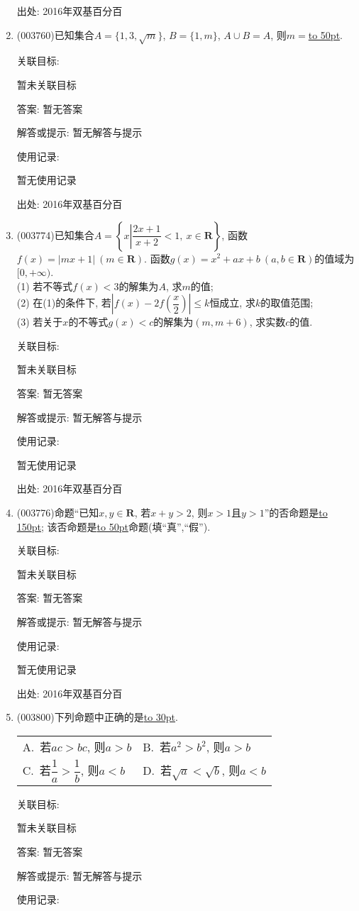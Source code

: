 \documentclass[10pt,a4paper]{article}
\newcommand{\blank}[1]{\underline{\hbox to #1pt{}}}
\newcommand{\twoch}[4]{\par\begin{tabular}{p{.46\textwidth}p{.46\textwidth}}
A.~#1& B.~#2\\
C.~#3& D.~#4
\end{tabular}}
\begin{document}
\begin{enumerate}[1.]
出处: 2016年双基百分百
\item { (003760)}已知集合$A=\{1,3,\sqrt{m}\}$, $B=\{1,m\}$, $A\cup B=A$, 则$m=$\blank{50}.


关联目标:

暂未关联目标

答案: 暂无答案

解答或提示: 暂无解答与提示

使用记录:

暂无使用记录


出处: 2016年双基百分百
\item { (003774)}已知集合$A=\left\{x\left|\dfrac{2x+1}{x+2}<1, \ x\in \mathbf{R}\right.\right\}$, 函数$f(x)=|mx+1| \ (m\in \mathbf{R})$. 函数$g(x)=x^2+ax+b \ (a,b\in \mathbf{R})$的值域为$[0,+\infty)$.\\
(1) 若不等式$f(x)<3$的解集为$A$, 求$m$的值;\\
(2) 在(1)的条件下, 若$\left|f(x)-2f\left(\dfrac x 2\right)\right|\le k$恒成立, 求$k$的取值范围;\\
(3) 若关于$x$的不等式$g(x)<c$的解集为$(m,m+6)$, 求实数$c$的值.


关联目标:

暂未关联目标

答案: 暂无答案

解答或提示: 暂无解答与提示

使用记录:

暂无使用记录


出处: 2016年双基百分百
\item { (003776)}命题``已知$x,y\in \mathbf{R}$,  若$x+y>2$, 则$x>1$且$y>1$''的否命题是\blank{150}; 该否命题是\blank{50}命题(填``真'',``假'').


关联目标:

暂未关联目标

答案: 暂无答案

解答或提示: 暂无解答与提示

使用记录:

暂无使用记录


出处: 2016年双基百分百
\item { (003800)}下列命题中正确的是\blank{30}.
\twoch{若$ac>bc$, 则$a>b$}{若$a^2>b^2$, 则$a>b$}{若$\dfrac 1a>\dfrac 1b$, 则$a<b$}{若$\sqrt{a}<\sqrt{b}$, 则$a<b$}


关联目标:

暂未关联目标

答案: 暂无答案

解答或提示: 暂无解答与提示

使用记录:


\end{enumerate}
\end{document}
